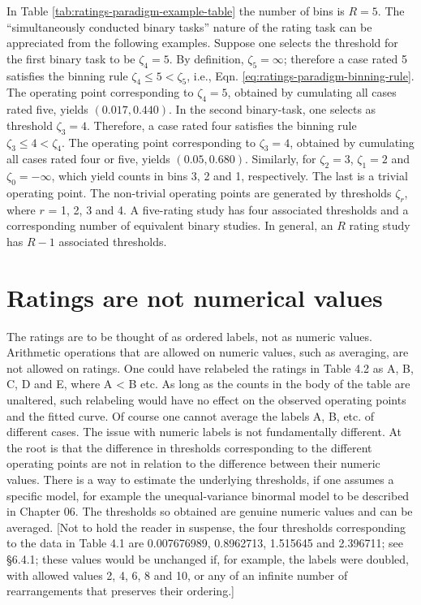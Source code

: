\documentclass[
]{book}
\begin{document}
In Table \ref{tab:ratings-paradigm-example-table} the number of bins is \(R = 5\). The ``simultaneously conducted binary tasks'' nature of the rating task can be appreciated from the following examples. Suppose one selects the threshold for the first binary task to be \(\zeta_4 = 5\). By definition, \(\zeta_5 = \infty\); therefore a case rated 5 satisfies the binning rule \(\zeta_4 \leq 5 < \zeta_5\), i.e., Eqn. \eqref{eq:ratings-paradigm-binning-rule}. The operating point corresponding to \(\zeta_4 = 5\), obtained by cumulating all cases rated five, yields \((0.017, 0.440)\). In the second binary-task, one selects as threshold \(\zeta_3 = 4\). Therefore, a case rated four satisfies the binning rule \(\zeta_3 \leq 4 < \zeta_4\). The operating point corresponding to \(\zeta_3 = 4\), obtained by cumulating all cases rated four or five, yields \((0.05, 0.680)\). Similarly, for \(\zeta_2 = 3\), \(\zeta_1 = 2\) and \(\zeta_0 = -\infty\), which yield counts in bins 3, 2 and 1, respectively. The last is a trivial operating point. The non-trivial operating points are generated by thresholds \(\zeta_r\), where \(r\) = 1, 2, 3 and 4. A five-rating study has four associated thresholds and a corresponding number of equivalent binary studies. In general, an \(R\) rating study has \(R-1\) associated thresholds.

\hypertarget{binary-task-ratings-not-numerical-values}{%
\section{Ratings are not numerical values}\label{binary-task-ratings-not-numerical-values}}

The ratings are to be thought of as ordered labels, not as numeric values. Arithmetic operations that are allowed on numeric values, such as averaging, are not allowed on ratings. One could have relabeled the ratings in Table 4.2 as A, B, C, D and E, where A \textless{} B etc. As long as the counts in the body of the table are unaltered, such relabeling would have no effect on the observed operating points and the fitted curve. Of course one cannot average the labels A, B, etc. of different cases. The issue with numeric labels is not fundamentally different. At the root is that the difference in thresholds corresponding to the different operating points are not in relation to the difference between their numeric values. There is a way to estimate the underlying thresholds, if one assumes a specific model, for example the unequal-variance binormal model to be described in Chapter 06. The thresholds so obtained are genuine numeric values and can be averaged. {[}Not to hold the reader in suspense, the four thresholds corresponding to the data in Table 4.1 are 0.007676989, 0.8962713, 1.515645 and 2.396711; see §6.4.1; these values would be unchanged if, for example, the labels were doubled, with allowed values 2, 4, 6, 8 and 10, or any of an infinite number of rearrangements that preserves their ordering.{]}
\end{document}
